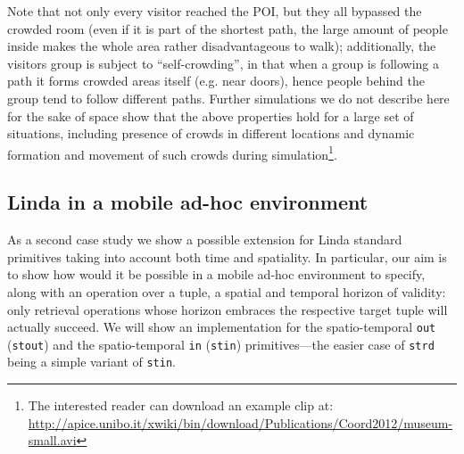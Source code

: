 \documentclass[12pt,a4paper,twoside,openright]{book}
\begin{document}
%
Note that not only every visitor reached the POI, but they all bypassed the crowded room (even if it is part of the shortest path, the large amount of people inside makes the whole area rather disadvantageous to walk); additionally, the visitors group is subject to ``self-crowding'', in that when a group is following a path it  forms crowded areas itself (e.g. near doors), hence people behind the group tend to follow different paths.
%
Further simulations we do not describe here for the sake of space show that the above properties hold for a large set of situations, including presence of crowds in different locations and dynamic formation and movement of such crowds during simulation\footnote{The interested reader can download an example clip at: {\url{http://apice.unibo.it/xwiki/bin/download/Publications/Coord2012/museum-small.avi}}}.

\subsection{Linda in a mobile ad-hoc environment}

As a second case study we show a possible extension for Linda standard primitives taking into account both time and spatiality.
%
In particular, our aim is to show how would it be possible in a mobile ad-hoc environment to specify, along with an operation over a tuple, a spatial and temporal horizon of validity: only retrieval operations whose horizon embraces the respective target tuple will actually succeed.
%
We will show an implementation for the spatio-temporal \texttt{out} (\texttt{stout}) and the spatio-temporal \texttt{in} (\texttt{stin}) primitives---the easier case of \texttt{strd} being a simple variant of \texttt{stin}.
\end{document}

